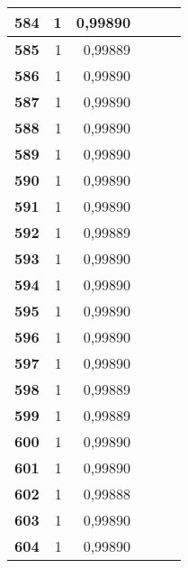\begin{longtable}{|r|r|r|l|r|r|}
\textbf{584} & 1 & 0,99890 &  & \multicolumn{1}{l|}{} & \multicolumn{1}{l|}{} \\ \hline
\textbf{585} & 1 & 0,99889 &  & \multicolumn{1}{l|}{} & \multicolumn{1}{l|}{} \\ \hline
\textbf{586} & 1 & 0,99890 &  & \multicolumn{1}{l|}{} & \multicolumn{1}{l|}{} \\ \hline
\textbf{587} & 1 & 0,99890 &  & \multicolumn{1}{l|}{} & \multicolumn{1}{l|}{} \\ \hline
\textbf{588} & 1 & 0,99890 &  & \multicolumn{1}{l|}{} & \multicolumn{1}{l|}{} \\ \hline
\textbf{589} & 1 & 0,99890 &  & \multicolumn{1}{l|}{} & \multicolumn{1}{l|}{} \\ \hline
\textbf{590} & 1 & 0,99890 &  & \multicolumn{1}{l|}{} & \multicolumn{1}{l|}{} \\ \hline
\textbf{591} & 1 & 0,99890 &  & \multicolumn{1}{l|}{} & \multicolumn{1}{l|}{} \\ \hline
\textbf{592} & 1 & 0,99889 &  & \multicolumn{1}{l|}{} & \multicolumn{1}{l|}{} \\ \hline
\textbf{593} & 1 & 0,99890 &  & \multicolumn{1}{l|}{} & \multicolumn{1}{l|}{} \\ \hline
\textbf{594} & 1 & 0,99890 &  & \multicolumn{1}{l|}{} & \multicolumn{1}{l|}{} \\ \hline
\textbf{595} & 1 & 0,99890 &  & \multicolumn{1}{l|}{} & \multicolumn{1}{l|}{} \\ \hline
\textbf{596} & 1 & 0,99890 &  & \multicolumn{1}{l|}{} & \multicolumn{1}{l|}{} \\ \hline
\textbf{597} & 1 & 0,99890 &  & \multicolumn{1}{l|}{} & \multicolumn{1}{l|}{} \\ \hline
\textbf{598} & 1 & 0,99889 &  & \multicolumn{1}{l|}{} & \multicolumn{1}{l|}{} \\ \hline
\textbf{599} & 1 & 0,99889 &  & \multicolumn{1}{l|}{} & \multicolumn{1}{l|}{} \\ \hline
\textbf{600} & 1 & 0,99890 &  & \multicolumn{1}{l|}{} & \multicolumn{1}{l|}{} \\ \hline
\textbf{601} & 1 & 0,99890 &  & \multicolumn{1}{l|}{} & \multicolumn{1}{l|}{} \\ \hline
\textbf{602} & 1 & 0,99888 &  & \multicolumn{1}{l|}{} & \multicolumn{1}{l|}{} \\ \hline
\textbf{603} & 1 & 0,99890 &  & \multicolumn{1}{l|}{} & \multicolumn{1}{l|}{} \\ \hline
\textbf{604} & 1 & 0,99890 &  & \multicolumn{1}{l|}{} & \multicolumn{1}{l|}{} \\ \hline

\end{longtable}
